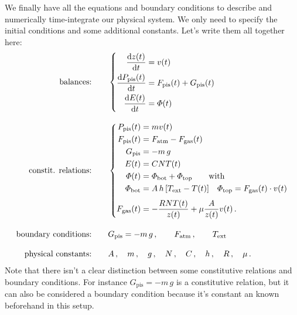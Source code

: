 \documentclass[a4paper,12pt,%
onecolumn,oneside,%
british%
]{memoir}
\newcommand*{\di}{\mathrm{d}}%
\renewcommand*{\|}[1][]{\nonscript\:#1\vert\nonscript\:\mathopen{}}
\newcommand*{\yvis}{\mu} %
\newcommand*{\yhea}{h} %
\newcommand*{\dt}{\di t}
\newcommand*{\yN}{N}
\newcommand*{\ym}{m}%
\newcommand*{\yE}{E}
\newcommand*{\yH}{\varPhi}%
\newcommand*{\yPpi}{P_{\textrm{pis}}}
\newcommand*{\yGpi}{G_{\textrm{pis}}}
\newcommand*{\yFpi}{F_{\textrm{pis}}}
\newcommand*{\yFgas}{F_{\textrm{gas}}}
\newcommand*{\yFatm}{F_{\textrm{atm}}}
\newcommand*{\yT}{T}%
\newcommand*{\yTe}{\yT_{\text{ext}}}%
\begin{document}
We finally have all the equations and boundary conditions to describe and numerically time-integrate our physical system. We only need to specify the initial conditions and some additional constants. Let's write them all together here:
\begin{equation*}
  \begin{aligned}
    \text{balances:}&\qquad\left\{
      \begin{aligned}
        \frac{\di z(t)}{\dt} &= v(t)
        \\
        \frac{\di \yPpi(t)}{\dt} &= \yFpi(t) + \yGpi(t)
        \\
        \frac{\di \yE(t)}{\dt} &= \yH(t)
      \end{aligned}
    \right.
    \\[3\jot]
    \text{constit. relations:}&\qquad\left\{
      \begin{aligned}
        \yPpi(t) &= \ym v(t)
        \\
        \yFpi(t) &= \yFatm - \yFgas(t)
        \\
        \yGpi &= -\ym\,g
        \\
        \yE(t) &= C\yN\yT(t)
        \\
        \yH(t) &= \yH_{\textrm{bot}} + \yH_{\textrm{top}}
        \qquad\text{with}
        \\
        \yH_{\textrm{bot}} &= A\,\yhea\,[\yTe-\yT(t)]
        \quad
        \yH_{\textrm{top}} =  \yFgas(t) \cdot v(t)
        \\[\jot]
        \yFgas(t) &= -\frac{R \yN \yT(t)}{z(t)}  + \yvis \frac{A}{z(t)} v(t) \,.
      \end{aligned}
    \right.
    \\[3\jot]
    \text{boundary conditions:}&\qquad
    \yGpi = -\ym\,g \,,
    \qquad
    \yFatm \,,
    \qquad
    \yTe
    \\[3\jot]
    \text{physical constants:}&\qquad
    A\,,\quad \ym \,,\quad g \,,\quad \yN \,,\quad C \,,\quad \yhea \,,\quad R \,,\quad \yvis \,.
  \end{aligned}
\end{equation*}
Note that there isn't a clear distinction between some constitutive relations and boundary conditions. For instance $\yGpi = -\ym\,g$ is a constitutive relation, but it can also be considered a boundary condition because it's constant an known beforehand in this setup.
\end{document}
